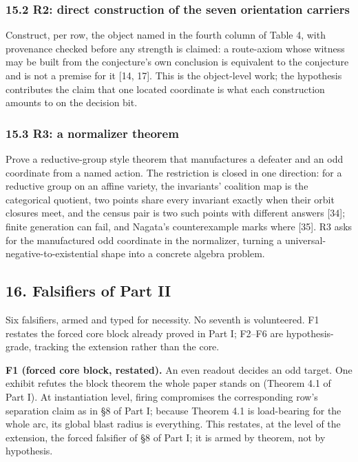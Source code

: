 \documentclass[10pt,twocolumn]{article}
\begin{document}
\subsubsection{15.2 R2: direct construction of the seven orientation
carriers}\label{r2-direct-construction-of-the-seven-orientation-carriers}

Construct, per row, the object named in the fourth column of Table 4,
with provenance checked before any strength is claimed: a route-axiom
whose witness may be built from the conjecture's own conclusion is
equivalent to the conjecture and is not a premise for it {[}14, 17{]}.
This is the object-level work; the hypothesis contributes the claim that
one located coordinate is what each construction amounts to on the
decision bit.

\subsubsection{15.3 R3: a normalizer
theorem}\label{r3-a-normalizer-theorem}

Prove a reductive-group style theorem that manufactures a defeater and
an odd coordinate from a named action. The restriction is closed in one
direction: for a reductive group on an affine variety, the invariants'
coalition map is the categorical quotient, two points share every
invariant exactly when their orbit closures meet, and the census pair is
two such points with different answers {[}34{]}; finite generation can
fail, and Nagata's counterexample marks where {[}35{]}. R3 asks for the
manufactured odd coordinate in the normalizer, turning a
universal-negative-to-existential shape into a concrete algebra problem.

\subsection{16. Falsifiers of Part II}\label{falsifiers-of-part-ii}

Six falsifiers, armed and typed for necessity. No seventh is
volunteered. F1 restates the forced core block already proved in Part I;
F2--F6 are hypothesis-grade, tracking the extension rather than the
core.

\textbf{F1 (forced core block, restated).} An even readout decides an
odd target. One exhibit refutes the block theorem the whole paper stands
on (Theorem 4.1 of Part I). At instantiation level, firing compromises
the corresponding row's separation claim as in §8 of Part I; because
Theorem 4.1 is load-bearing for the whole arc, its global blast radius
is everything. This restates, at the level of the extension, the forced
falsifier of §8 of Part I; it is armed by theorem, not by hypothesis.
\end{document}
